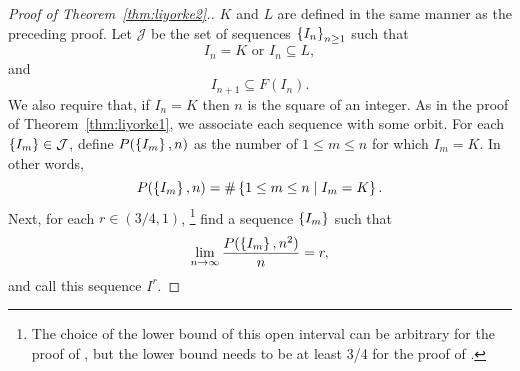 \documentclass[12pt,draft,twoside]{book}
\begin{document}
\begin{proof}[Proof of Theorem~\ref{thm:liyorke2}.]
  $K$ and $L$ are defined in the same manner as the preceding proof.
  Let $\mathcal{J}$ be the set of sequences $\left \{ I_n \right \}^{ }_{n\geq1}$ such that
  \begin{equation*}
    I_n = K \mbox{ or } I_n \subseteq L,
  \end{equation*}
  and 
  \begin{equation*}
    I_{n+1} \subseteq F(I_n).
  \end{equation*}
  We also require that, if $I_n = K$ then $n$ is the square of an integer.
  As in the proof of Theorem~\ref{thm:liyorke1}, we associate each sequence with some orbit.
  For each $\left \{ I_m \right \} \in \mathcal{J}$, define $P(\left \{ I_m \right \},n)$ as the number of $1 \leq m \leq n$ for which $I_m = K$.
  In other words,
  \begin{equation*}
    P(\left \{ I_m \right \},n) = \#\left \{ 1 \leq m \leq n \mathrel{} \middle| \mathrel{} I_m = K \right \}.
  \end{equation*}
  Next, for each $r \in (3/4, 1)$, \footnote{The choice of the lower bound of this open interval can be arbitrary for the proof of , but the lower bound needs to be at least 3/4 for the proof of .} find a sequence $\left \{ I_m \right \}$ such that
  \begin{equation}
    \lim\limits_{n\to \infty}\frac{P(\left \{ I_m \right \},n^2)}{n} = r,
    \label{eqn:Kratio}
  \end{equation}
  and call this sequence $I^r$.
  

\end{proof}
\end{document}

